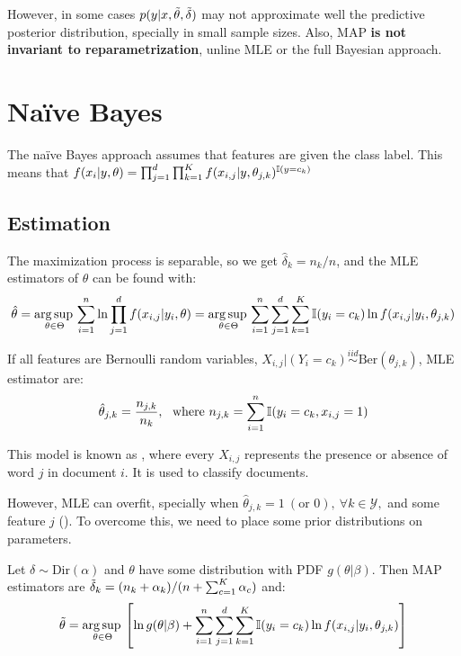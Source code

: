 However, in some cases $p(y|x,\Tilde{\theta},\Tilde{\delta}) $ may not approximate well the predictive posterior distribution, specially in small sample sizes. Also, MAP \textbf{is not invariant to reparametrization}, unline MLE or the full Bayesian approach.


\section{Naïve Bayes}
The naïve Bayes approach assumes that features are  given the class label. This means that $f(x_i|y,\theta)=\prod_{j=1}^d\prod_{k=1}^K  f(x_{i,j}|y,\theta_{j,k})^{\operatorname{\mathbb{I}}(y=c_k)}$

\subsection{Estimation}

The maximization process is separable, so we get $\hat{\delta}_{k}=n_k/n$, and the MLE estimators of $\theta$ can be found with:
\begin{equation*}
    \hat{\theta}  = \operatorname*{arg\,sup\,}_{\theta\in\Theta} \sum_{i=1}^n\ln\prod_{j=1}^d f(x_{i,j}|y_i,\theta) = \operatorname*{arg\,sup\,}_{\theta\in\Theta} \sum_{i=1}^n\sum_{j=1}^d\sum_{k=1}^K\operatorname{\mathbb{I}}(y_i=c_k)\ln f(x_{i,j}|y_i,\theta_{j,k})
\end{equation*}


If all features are Bernoulli random variables, $X_{i,j}|(Y_i=c_k)\overset{iid}{\sim}\text{Ber}(\theta_{j,k})$, MLE estimator are:
\begin{equation*}
    \hat{\theta}_{j,k} = \frac{n_{j,k}}{n_k},\ \text{ where } n_{j,k}=\sum_{i=1}^n\operatorname{\mathbb{I}}(y_i=c_k,x_{i,j}=1)
\end{equation*}

This model is known as , where every $X_{i,j}$ represents the presence or absence of word $j$ in document $i$. It is used to classify documents. 

However, MLE can overfit, specially when $\hat{\theta}_{j,k}=1\ (\text{or } 0),\ \forall k\in\mathcal{Y},$ and some feature $j$ (). To overcome this, we need to place some prior distributions on parameters. 

Let $\delta\sim\text{Dir}(\alpha)$ and $\theta$ have some distribution with PDF $g(\theta|\beta)$. Then MAP estimators are $\Tilde{\delta}_k = (n_k+\alpha_k)/(n+\sum_{c=1}^K\alpha_c)$ and:
\begin{equation*}
    \Tilde{\theta} = \operatorname*{arg\,sup\,}_{\theta\in\Theta} \left[\ln g(\theta|\beta)+ \sum_{i=1}^n\sum_{j=1}^d\sum_{k=1}^K\operatorname{\mathbb{I}}(y_i=c_k)\ln f(x_{i,j}|y_i,\theta_{j,k})\right]
\end{equation*}

